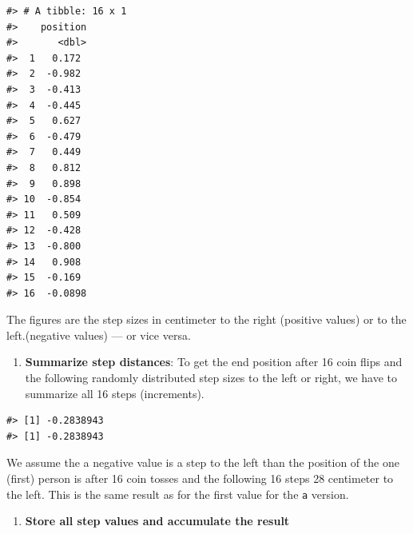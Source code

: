 \documentclass[
  letterpaper,
  DIV=11,
  numbers=noendperiod]{scrreprt}
\newenvironment{Shaded}{\begin{snugshade}}{\end{snugshade}}
\newcommand{\CommentTok}[1]{\textcolor[rgb]{0.37,0.37,0.37}{#1}}
\newcommand{\DecValTok}[1]{\textcolor[rgb]{0.68,0.00,0.00}{#1}}
\newcommand{\FunctionTok}[1]{\textcolor[rgb]{0.28,0.35,0.67}{#1}}
\newcommand{\InformationTok}[1]{\textcolor[rgb]{0.37,0.37,0.37}{#1}}
\newcommand{\NormalTok}[1]{\textcolor[rgb]{0.00,0.23,0.31}{#1}}
\newcommand{\SpecialCharTok}[1]{\textcolor[rgb]{0.37,0.37,0.37}{#1}}
\providecommand{\tightlist}{%
  \setlength{\itemsep}{0pt}\setlength{\parskip}{0pt}}\usepackage{longtable,booktabs,array}
\begin{document}
\begin{verbatim}
#> # A tibble: 16 x 1
#>    position
#>       <dbl>
#>  1   0.172 
#>  2  -0.982 
#>  3  -0.413 
#>  4  -0.445 
#>  5   0.627 
#>  6  -0.479 
#>  7   0.449 
#>  8   0.812 
#>  9   0.898 
#> 10  -0.854 
#> 11   0.509 
#> 12  -0.428 
#> 13  -0.800 
#> 14   0.908 
#> 15  -0.169 
#> 16  -0.0898
\end{verbatim}

The figures are the step sizes in centimeter to the right (positive
values) or to the left.(negative values) --- or vice versa.

\begin{enumerate}
\def\labelenumi{\arabic{enumi}.}
\setcounter{enumi}{2}
\tightlist
\item
  \textbf{Summarize step distances}: To get the end position after 16
  coin flips and the following randomly distributed step sizes to the
  left or right, we have to summarize all 16 steps (increments).
\end{enumerate}

\begin{Shaded}
\end{Shaded}

\begin{verbatim}
#> [1] -0.2838943
#> [1] -0.2838943
\end{verbatim}

We assume the a negative value is a step to the left than the position
of the one (first) person is after 16 coin tosses and the following 16
steps 28 centimeter to the left. This is the same result as for the
first value for the \texttt{a} version.

\begin{enumerate}
\def\labelenumi{\arabic{enumi}.}
\setcounter{enumi}{3}
\tightlist
\item
  \textbf{Store all step values and accumulate the result}
\end{enumerate}
\end{document}
